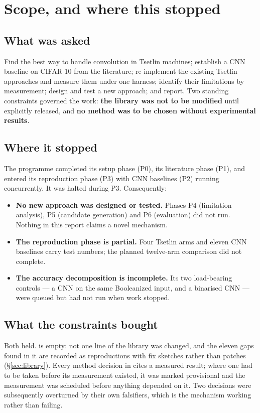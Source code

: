 \section{Scope, and where this stopped}

\subsection{What was asked}
Find the best way to handle convolution in Tsetlin machines; establish a CNN baseline on CIFAR-10
from the literature; re-implement the existing Tsetlin approaches and measure them under one harness;
identify their limitations by measurement; design and test a new approach; and report. Two standing
constraints governed the work: \textbf{the  library was not to be modified} until
explicitly released, and \textbf{no method was to be chosen without experimental results}.

\subsection{Where it stopped}
The programme completed its setup phase (P0), its literature phase (P1), and entered its reproduction
phase (P3) with CNN baselines (P2) running concurrently. It was halted during P3. Consequently:

\begin{itemize}
\item \textbf{No new approach was designed or tested.} Phases P4 (limitation analysis), P5 (candidate
      generation) and P6 (evaluation) did not run. Nothing in this report claims a novel mechanism.
\item \textbf{The reproduction phase is partial.} Four Tsetlin arms and eleven CNN baselines carry
      test numbers; the planned twelve-arm comparison did not complete.
\item \textbf{The accuracy decomposition is incomplete.} Its two load-bearing controls --- a CNN on
      the same Booleanized input, and a binarised CNN --- were queued but had not run when work
      stopped.
\end{itemize}

\subsection{What the constraints bought}
Both held.  is empty: not one line of the library was changed, and the eleven
gaps found in it are recorded as reproductions with fix sketches rather than patches
(\S\ref{sec:library}). Every method decision in  cites a measured result; where one
had to be taken before its measurement existed, it was marked provisional and the measurement was
scheduled before anything depended on it. Two decisions were subsequently overturned by their own
falsifiers, which is the mechanism working rather than failing.
